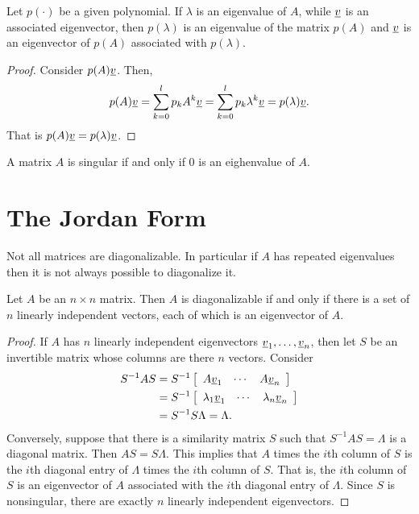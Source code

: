 \begin{theorem}
Let $p( \cdot )$ be a given polynomial.
If $\lambda$ is an eigenvalue of $A$, while $\underline{v}$ is an associated eigenvector, then $p ( \lambda )$ is an eigenvalue of the matrix $p (A)$ and $\underline{v}$ is an eigenvector of $p(A)$ associated with $p(\lambda)$.
\end{theorem}
\begin{proof}
Consider $p(A) \underline{v}$.
Then,
\begin{equation*}
p( A ) \underline{v} = \sum_{k=0}^l p_k A^k \underline{v}
= \sum_{k=0}^l p_k \lambda^k \underline{v}
= p( \lambda ) \underline{v} .
\end{equation*}
That is $p(A) \underline{v} = p( \lambda ) \underline{v}$.
\end{proof}

A matrix $A$ is singular if and only if $0$ is an eighenvalue of $A$.

\section{The Jordan Form}

Not all matrices are diagonalizable.
In particular if $A$ has repeated eigenvalues then it is not always possible to diagonalize it.

\begin{theorem}
Let $A$ be an $n \times n$ matrix.
Then $A$ is diagonalizable if and only if there is a set of $n$ linearly independent vectors, each of which is an eigenvector of $A$.
\end{theorem}

\begin{proof}
If $A$ has $n$ linearly independent eigenvectors $\underline{v}_1, \ldots, \underline{v}_n$, then let $S$ be an invertible matrix whose columns are there $n$ vectors.
Consider
\begin{equation*}
\begin{split}
S^{-1} A S &= S^{-1} \left[ \begin{array}{ccc} A \underline{v}_1 & \cdots & A \underline{v}_n \end{array} \right] \\
&= S^{-1} \left[ \begin{array}{ccc} \lambda_1 \underline{v}_1 & \cdots & \lambda_n \underline{v}_n \end{array} \right] \\
&= S^{-1} S \Lambda = \Lambda .
\end{split}
\end{equation*}
Conversely, suppose that there is a similarity matrix $S$ such that $S^{-1} A S = \Lambda$ is a diagonal matrix.
Then $A S = S \Lambda$.
This implies that $A$ times the $i$th column of $S$ is the $i$th diagonal entry of $\Lambda$ times the $i$th column of $S$.
That is, the $i$th column of $S$ is an eigenvector of $A$ associated with the $i$th diagonal entry of $\Lambda$.
Since $S$ is nonsingular, there are exactly $n$ linearly independent eigenvectors.
\end{proof}

